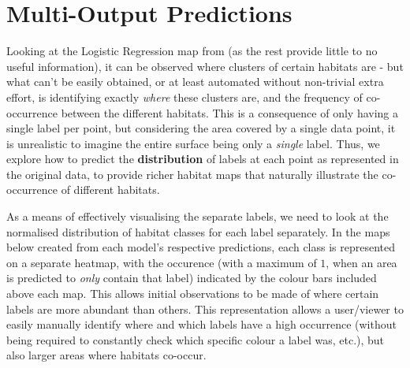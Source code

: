 \section{Multi-Output Predictions} 
Looking at the Logistic Regression map from  (as the rest provide little to no useful information), it can be observed where clusters of certain habitats are - but what can't be easily obtained, or at least automated without non-trivial extra effort, is identifying exactly \textit{where} these clusters are, and the frequency of co-occurrence between the different habitats. This is a consequence of only having a single label per point, but considering the area covered by a single data point, it is unrealistic to imagine the entire surface being only a \textit{single} label. Thus, we explore how to predict the \textbf{distribution} of labels at each point as represented in the original data, to provide richer habitat maps that naturally illustrate the co-occurrence of different habitats.

As a means of effectively visualising the separate labels, we need to look at the normalised distribution of habitat classes for each label separately. In the maps below created from each model's respective predictions, each class is represented on a separate heatmap, with the occurence (with a maximum of $1$, when an area is predicted to \textit{only} contain that label) indicated by the colour bars included above each map. This allows initial observations to be made of where certain labels are more abundant than others. This representation allows a user/viewer to easily manually identify where and which labels have a high occurrence (without being required to constantly check which specific colour a label was, etc.), but also larger areas where habitats co-occur.

